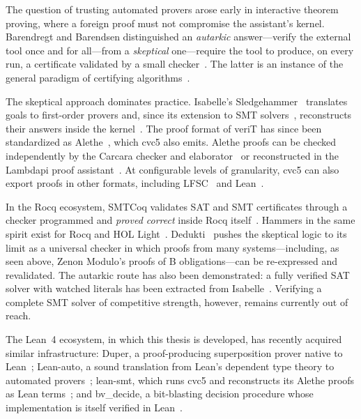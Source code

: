 The question of trusting automated provers arose early in interactive theorem
proving, where a foreign proof must not compromise the assistant's kernel.
Barendregt and Barendsen distinguished an \emph{autarkic} answer---verify the
external tool once and for all---from a \emph{skeptical} one---require the tool
to produce, on every run, a certificate validated by a small
checker~\cite{barendregt2002autarkic}. The latter is an instance of the general
paradigm of certifying algorithms~\cite{mcconnell2011certifying}.

The skeptical approach dominates practice.
Isabelle's Sledgehammer~\cite{paulson2010sledgehammer} translates goals to
first-order provers and, since its extension to SMT
solvers~\cite{blanchette2013extending}, reconstructs their answers inside the
kernel~\cite{boehme2010z3,barbosa2020scalable}. The proof format of veriT has
since been standardized as Alethe~\cite{schurr2021alethe}, which cvc5 also
emits. Alethe proofs can be checked independently by the Carcara checker and
elaborator~\cite{andreotti2023carcara} or reconstructed in the Lambdapi proof
assistant~\cite{coltellacci2026reconstruction}. At configurable levels of
granularity, cvc5 can also export proofs in other formats, including
LFSC~\cite{stump2013lfsc} and Lean~\cite{barbosa2022flexible}.

In the Rocq ecosystem, SMTCoq validates SAT and SMT certificates through a
checker programmed and \emph{proved correct} inside Rocq
itself~\cite{armand2011modular,ekici2017smtcoq}. Hammers in the same spirit
exist for Rocq and HOL Light~\cite{czajka2018coqhammer,kaliszyk2014flyspeck}.
Dedukti~\cite{boespflug2012lambdapi,assaf2023dedukti} pushes the skeptical logic
to its limit as a universal checker in which proofs from many
systems---including, as seen above, Zenon Modulo's proofs of B obligations---can
be re-expressed and revalidated. The autarkic route has also been demonstrated:
a fully verified SAT solver with watched literals has been extracted from
Isabelle~\cite{fleury2018sat}. Verifying a complete SMT solver of competitive
strength, however, remains currently out of reach.

The Lean~4 ecosystem, in which this thesis is developed, has recently acquired
similar infrastructure: Duper, a proof-producing superposition prover native
to Lean~\cite{clune2024duper}; Lean-auto, a sound translation from Lean's
dependent type theory to automated provers~\cite{qian2025leanauto}; lean-smt,
which runs cvc5 and reconstructs its Alethe proofs as Lean
terms~\cite{mohamed2025leansmt}; and bv\_decide, a bit-blasting decision
procedure whose implementation is itself verified in
Lean~\cite{boeving2025bvdecide}.

